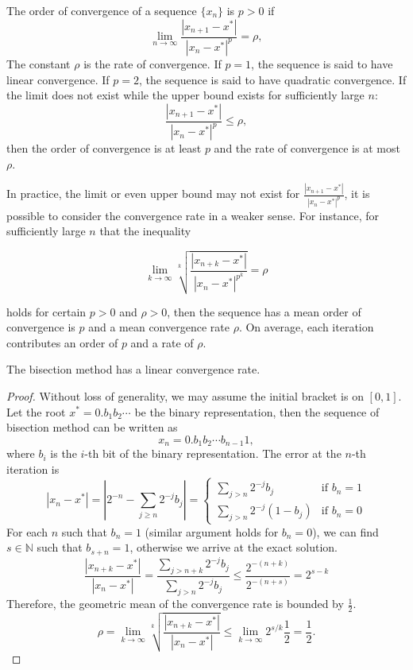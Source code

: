 \begin{definition}
The order of convergence of a sequence $\{x_n\}$ is $p > 0$ if 
$$
\lim_{n\to\infty}\frac{|x_{n+1} - x^{\ast}|}{|x_n - x^{\ast}|^p} = \rho,
$$
The constant $\rho$ is the rate of convergence. If $p = 1$, the sequence is said to have linear convergence. If $p = 2$, the sequence is said to have quadratic convergence. 
If the limit does not exist while the upper bound exists for sufficiently large $n$:
$$
\frac{|x_{n+1} - x^{\ast}|}{|x_n - x^{\ast}|^p} \le \rho,
$$
then the order of convergence is at least $p$ and the rate of convergence is at most $\rho$.
\end{definition}
\begin{remark}
   In practice, the limit or even upper bound may not exist for $\frac{|x_{n+1} - x^{\ast}|}{|x_n - x^{\ast}|^p}$, it is possible to consider the convergence rate in a weaker sense. For instance, for sufficiently large $n$ that the inequality 

$$
\lim_{k\to\infty}\sqrt[k]{\frac{|x_{n+k} - x^{\ast}|}{|x_n - x^{\ast}|^{p^k}}}= \rho
$$

holds for certain $p > 0$ and $\rho > 0$, then the sequence has a mean order of convergence is $p$ and a mean convergence rate $\rho$. On average, each iteration contributes an order of $p$ and a rate of $\rho$. 
\end{remark}

\begin{theorem}
The bisection method has a linear convergence rate.   
\end{theorem}

\begin{proof}
Without loss of generality, we may assume the initial bracket is on $[0, 1]$. Let the root $x^{\ast} = 0.b_1 b_2\cdots$ be the binary representation, then the sequence of bisection method can be written as 
$$
x_n = 0.b_1 b_2\cdots b_{n-1} 1,
$$
where $b_i$ is the $i$-th bit of the binary representation. The error at the $n$-th iteration is
$$|x_n - x^{\ast}| = |2^{-n} - \sum_{j\ge n} 2^{-j} b_j|=\begin{cases}\sum_{j>n} 2^{-j}b_j & \text{if } b_n=1\\\sum_{j>n} 2^{-j}(1-b_j) &\text{if }b_n=0\end{cases}$$
For each $n$ such that $b_n = 1$ (similar argument holds for $b_n=0$), we can find $s\in\mathbb N$ such that $b_{s+n} = 1$, otherwise we arrive at the exact solution. 
$$
\frac{|x_{n+k} - x^{\ast}|}{|x_n - x^{\ast}|} = \frac{\sum_{j>n+k} 2^{-j} b_j }{\sum_{j>n} 2^{-j}b_j} \le \frac{2^{-(n+k)}}{2^{-(n+s)}} =2^{s - k} $$
Therefore, the geometric mean of the convergence rate is bounded by $\frac{1}{2}$.
$$
\rho =\lim_{k\to\infty} \sqrt[k]{\frac{|x_{n+k} - x^{\ast}|}{|x_n - x^{\ast}|}} \le \lim_{k\to\infty}2^{s/k}\frac{1}{2} =\frac{1}{2}.
$$
\end{proof}


